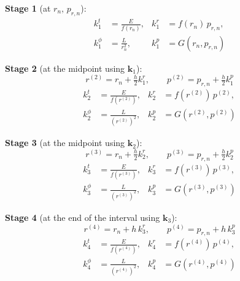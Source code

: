 \documentclass[11pt,a4paper]{article}
\begin{document}
\textbf{Stage 1} (at $r_n,\, p_{r,n}$):
\begin{equation*}
\begin{aligned}
    k_1^t &= \frac{E}{f(r_n)}, &
    k_1^r &= f(r_n)\, p_{r,n}, \\[4pt]
    k_1^\phi &= \frac{L}{r_n^2}, &
    k_1^p &= G(r_n, p_{r,n})
\end{aligned}
\end{equation*}

\textbf{Stage 2} (at the midpoint using $\mathbf{k}_1$):
\begin{equation*}
r^{(2)} = r_n + \tfrac{h}{2}k_1^r, \qquad p^{(2)} = p_{r,n} + \tfrac{h}{2}k_1^p
\end{equation*}
\begin{equation*}
\begin{aligned}
    k_2^t &= \frac{E}{f(r^{(2)})}, &
    k_2^r &= f(r^{(2)})\, p^{(2)}, \\[4pt]
    k_2^\phi &= \frac{L}{\left(r^{(2)}\right)^2}, &
    k_2^p &= G\left(r^{(2)}, p^{(2)}\right)
\end{aligned}
\end{equation*}

\textbf{Stage 3} (at the midpoint using $\mathbf{k}_2$):
\begin{equation*}
r^{(3)} = r_n + \tfrac{h}{2}k_2^r, \qquad p^{(3)} = p_{r,n} + \tfrac{h}{2}k_2^p
\end{equation*}
\begin{equation*}
\begin{aligned}
    k_3^t &= \frac{E}{f(r^{(3)})}, &
    k_3^r &= f(r^{(3)})\, p^{(3)}, \\[4pt]
    k_3^\phi &= \frac{L}{\left(r^{(3)}\right)^2}, &
    k_3^p &= G\left(r^{(3)}, p^{(3)}\right)
\end{aligned}
\end{equation*}

\textbf{Stage 4} (at the end of the interval using $\mathbf{k}_3$):
\begin{equation*}
r^{(4)} = r_n + h\,k_3^r, \qquad p^{(4)} = p_{r,n} + h\,k_3^p
\end{equation*}
\begin{equation*}
\begin{aligned}
    k_4^t &= \frac{E}{f(r^{(4)})}, &
    k_4^r &= f(r^{(4)})\, p^{(4)}, \\[4pt]
    k_4^\phi &= \frac{L}{\left(r^{(4)}\right)^2}, &
    k_4^p &= G\left(r^{(4)}, p^{(4)}\right)
\end{aligned}
\end{equation*}
\end{document}

